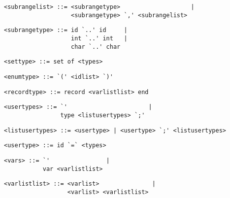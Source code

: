 \begin{footnotesize}
\begin{lstlisting}[frame=single, label={subrangelist}, language=pie]
<subrangelist> ::= <subrangetype>                    |
                   <subrangetype> `,' <subrangelist>
\end{lstlisting}

\begin{lstlisting}[frame=single, label={subrangetype}, language=pie]
<subrangetype> ::= id `..' id     |
                   int `..' int   | 
                   char `..' char
\end{lstlisting}

\begin{lstlisting}[frame=single, label={settype}, language=pie]
<settype> ::= set of <types>
\end{lstlisting}

\begin{lstlisting}[frame=single, label={enumtype}, language=pie]
<enumtype> ::= `(' <idlist> `)'
\end{lstlisting}

\begin{lstlisting}[frame=single, label={recordtype}, language=pie]
<recordtype> ::= record <varlistlist> end
\end{lstlisting}

\begin{lstlisting}[frame=single, label={usertypes}]
<usertypes> ::= `'                       |
                type <listusertypes> `;'
\end{lstlisting}

\begin{lstlisting}[frame=single, label={listusertypes}]
<listusertypes> ::= <usertype> | <usertype> `;' <listusertypes>
\end{lstlisting}

\begin{lstlisting}[frame=single, label={listusertypes}]
<usertype> ::= id `=` <types>
\end{lstlisting}

\begin{lstlisting}[frame=single, label={vars}, language=pie]
<vars> ::= `'                |
           var <varlistlist>
\end{lstlisting}

\begin{lstlisting}[frame=single, label={varlistlist}, language=pie]
<varlistlist> ::= <varlist>               |
                  <varlist> <varlistlist>
\end{lstlisting}


\end{footnotesize}
